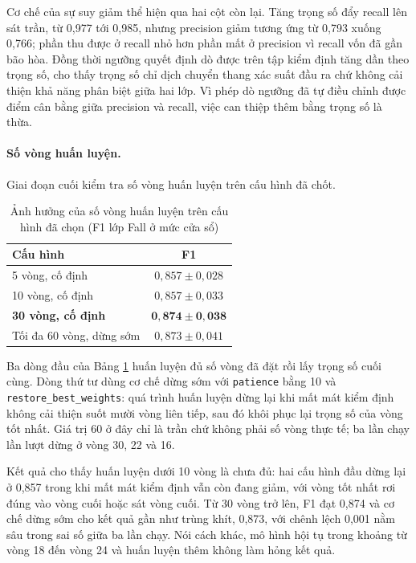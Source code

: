 Cơ chế của sự suy giảm thể hiện qua hai cột còn lại. Tăng trọng số đẩy recall lên sát trần, từ 0,977 tới 0,985, nhưng precision giảm tương ứng từ 0,793 xuống 0,766; phần thu được ở recall nhỏ hơn phần mất ở precision vì recall vốn đã gần bão hòa. Đồng thời ngưỡng quyết định dò được trên tập kiểm định tăng dần theo trọng số, cho thấy trọng số chỉ dịch chuyển thang xác suất đầu ra chứ không cải thiện khả năng phân biệt giữa hai lớp. Vì phép dò ngưỡng đã tự điều chỉnh được điểm cân bằng giữa precision và recall, việc can thiệp thêm bằng trọng số là thừa.

\paragraph{Số vòng huấn luyện.}
Giai đoạn cuối kiểm tra số vòng huấn luyện trên cấu hình đã chốt.

\begin{table}[htbp]
\centering
\caption{Ảnh hưởng của số vòng huấn luyện trên cấu hình đã chọn (F1 lớp Fall ở mức cửa sổ)}
\label{tab:lstm_epoch_sweep}
\small
\begin{tabular}{|l|c|}
\hline
\textbf{Cấu hình} & \textbf{F1} \\
\hline
5 vòng, cố định & $0{,}857\pm0{,}028$ \\
\hline
10 vòng, cố định & $0{,}857\pm0{,}033$ \\
\hline
\textbf{30 vòng, cố định} & $\mathbf{0{,}874\pm0{,}038}$ \\
\hline
Tối đa 60 vòng, dừng sớm & $0{,}873\pm0{,}041$ \\
\hline
\end{tabular}
\end{table}

Ba dòng đầu của Bảng \ref{tab:lstm_epoch_sweep} huấn luyện đủ số vòng đã đặt rồi lấy trọng số cuối cùng. Dòng thứ tư dùng cơ chế dừng sớm với \texttt{patience} bằng 10 và \texttt{restore\_best\_weights}: quá trình huấn luyện dừng lại khi mất mát kiểm định không cải thiện suốt mười vòng liên tiếp, sau đó khôi phục lại trọng số của vòng tốt nhất. Giá trị 60 ở đây chỉ là trần chứ không phải số vòng thực tế; ba lần chạy lần lượt dừng ở vòng 30, 22 và 16.

Kết quả cho thấy huấn luyện dưới 10 vòng là chưa đủ: hai cấu hình đầu dừng lại ở 0,857 trong khi mất mát kiểm định vẫn còn đang giảm, với vòng tốt nhất rơi đúng vào vòng cuối hoặc sát vòng cuối. Từ 30 vòng trở lên, F1 đạt 0,874 và cơ chế dừng sớm cho kết quả gần như trùng khít, 0,873, với chênh lệch 0,001 nằm sâu trong sai số giữa ba lần chạy. Nói cách khác, mô hình hội tụ trong khoảng từ vòng 18 đến vòng 24 và huấn luyện thêm không làm hỏng kết quả.

